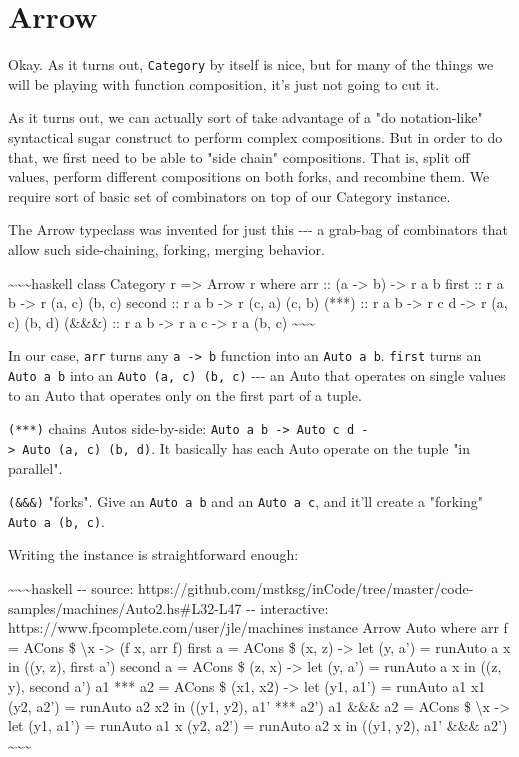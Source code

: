 \documentclass[]{article}
\begin{document}
\section{Arrow}

Okay. As it turns out, \texttt{Category} by itself is nice, but for many of the
things we will be playing with function composition, it's just not going to cut
it.

As it turns out, we can actually sort of take advantage of a "do notation-like"
syntactical sugar construct to perform complex compositions. But in order to do
that, we first need to be able to "side chain" compositions. That is, split off
values, perform different compositions on both forks, and recombine them. We
require sort of basic set of combinators on top of our Category instance.

The Arrow typeclass was invented for just this -\/-\/- a grab-bag of combinators
that allow such side-chaining, forking, merging behavior.

\textasciitilde{}\textasciitilde{}\textasciitilde{}haskell class Category r
=\textgreater{} Arrow r where arr :: (a -\textgreater{} b) -\textgreater{} r a b
first :: r a b -\textgreater{} r (a, c) (b, c) second :: r a b -\textgreater{} r
(c, a) (c, b) (***) :: r a b -\textgreater{} r c d -\textgreater{} r (a, c) (b,
d) (\&\&\&) :: r a b -\textgreater{} r a c -\textgreater{} r a (b, c)
\textasciitilde{}\textasciitilde{}\textasciitilde{}

In our case, \texttt{arr} turns any \texttt{a\ -\textgreater{}\ b} function into
an \texttt{Auto\ a\ b}. \texttt{first} turns an \texttt{Auto\ a\ b} into an
\texttt{Auto\ (a,\ c)\ (b,\ c)} -\/-\/- an Auto that operates on single values
to an Auto that operates only on the first part of a tuple.

\texttt{(***)} chains Autos side-by-side:
\texttt{Auto\ a\ b\ -\textgreater{}\ Auto\ c\ d\ -\textgreater{}\ Auto\ (a,\ c)\ (b,\ d)}.
It basically has each Auto operate on the tuple "in parallel".

\texttt{(\&\&\&)} "forks". Give an \texttt{Auto\ a\ b} and an
\texttt{Auto\ a\ c}, and it'll create a "forking" \texttt{Auto\ a\ (b,\ c)}.

Writing the instance is straightforward enough:

\textasciitilde{}\textasciitilde{}\textasciitilde{}haskell -\/- source:
https://github.com/mstksg/inCode/tree/master/code-samples/machines/Auto2.hs\#L32-L47
-\/- interactive: https://www.fpcomplete.com/user/jle/machines instance Arrow
Auto where arr f = ACons \$ \textbackslash{}x -\textgreater{} (f x, arr f) first
a = ACons \$ (x, z) -\textgreater{} let (y, a') = runAuto a x in ((y, z), first
a') second a = ACons \$ (z, x) -\textgreater{} let (y, a') = runAuto a x in ((z,
y), second a') a1 *** a2 = ACons \$ (x1, x2) -\textgreater{} let (y1, a1') =
runAuto a1 x1 (y2, a2') = runAuto a2 x2 in ((y1, y2), a1' *** a2') a1 \&\&\& a2
= ACons \$ \textbackslash{}x -\textgreater{} let (y1, a1') = runAuto a1 x (y2,
a2') = runAuto a2 x in ((y1, y2), a1' \&\&\& a2')
\textasciitilde{}\textasciitilde{}\textasciitilde{}
\end{document}
